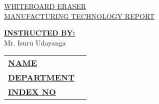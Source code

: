\documentclass[12pt,a4paper,oneside]{article}
\begin{document}
\begin{titlepage}


    \begin{flushright}
    \end{flushright}


    \vspace*{\fill}
    \begin{center}
        \uppercase{\fontsize{30}{45}\selectfont \ul{Whiteboard Eraser}}\\
        \uppercase{\fontsize{20}{30}\selectfont \ul{Manufacturing Technology Report}}
    \end{center}
    \vfill %


    \begin{multicols}{2}
        \noindent\textbf{\underline{INSTRUCTED BY:}} \\ Mr. Isuru Udayanga\\

        \columnbreak


        \begin{tabular}{ll}
            \vspace{6pt}

            \textbf{\uppercase{\underline{Name}}}       &
            \textbf{\uppercase{\fontsize{12}{18} \selectfont {:}}}
            {\fontsize{12}{18} \selectfont {B Gnanakeethan}}      \\

            \vspace{6pt}
            \textbf{\uppercase{\underline{Department}}} &
            \textbf{\uppercase{\fontsize{12}{18} \selectfont {:}}}
            {\fontsize{12}{18} \selectfont {Engineering Tech.}}\\

            \vspace{6pt}
            \textbf{\uppercase{\underline{Index No}}}   &
            \textbf{\uppercase{\fontsize{12}{18} \selectfont {:}}}
            {\fontsize{12}{18} \selectfont {EGT/16/00037}}  \\



        \end{tabular}
    \end{multicols}

\end{titlepage}
\end{document}
